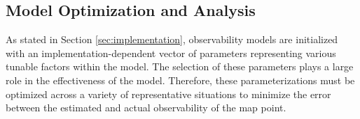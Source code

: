 \subsection{Model Optimization and Analysis}

As stated in Section \ref{sec:implementation}, observability models are initialized with an implementation-dependent vector of parameters representing various tunable factors within the model. The selection of these parameters plays a large role in the effectiveness of the model. Therefore, these parameterizations must be optimized across a variety of representative situations to minimize the error between the estimated and actual observability of the map point. 

\subsubsection{}